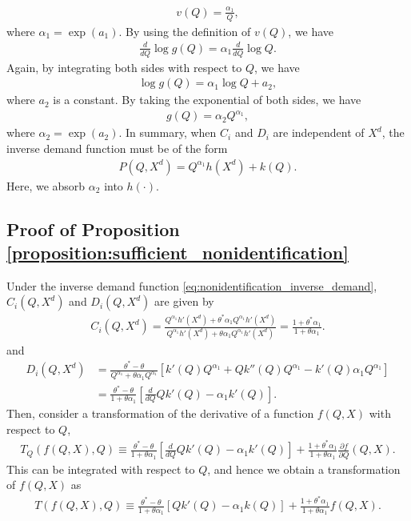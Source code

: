 \documentclass[11pt, a4paper]{article}
\theoremstyle{remark}
\begin{document}
\begin{align}
    v(Q) = \frac{\alpha_1}{Q}, 
\end{align}
where $\alpha_1 = \exp(a_1)$.
By using the definition of $v(Q)$, we have
\begin{align}
    \frac{d }{d Q}\log g(Q) = \alpha_1\frac{d}{dQ}\log Q.
\end{align}
Again, by integrating both sides with respect to $Q$, we have
\begin{align}
    \log g(Q) = \alpha_1\log Q + a_2,
\end{align}
where $a_2$ is a constant.
By taking the exponential of both sides, we have
\begin{align}
    g(Q) = \alpha_2Q^{\alpha_1},
\end{align}
where $\alpha_2 = \exp(a_2)$.
In summary, when $C_i$ and $D_i$ are independent of $X^{d}$, the inverse demand function must be of the form
\begin{align}
    P(Q, X^{d}) = Q^{\alpha_1}h(X^{d}) + k(Q).
\end{align}
Here, we absorb $\alpha_2$ into $h(\cdot)$.






\subsection{Proof of Proposition \ref{proposition:sufficient_nonidentification}}
Under the inverse demand function \eqref{eq:nonidentification_inverse_demand}, $C_i(Q, X^{d})$ and $D_i(Q, X^{d})$ are given by
\begin{align}
    C_i(Q, X^{d}) = \frac{Q^{\alpha_1}h'(X^{d}) + \theta^{*}\alpha_1Q^{\alpha_1}h'(X^{d})}{Q^{\alpha_1}h'(X^{d}) + \theta \alpha_1 Q^{\alpha_1}h'(X^{d})} = \frac{1 + \theta^{*}\alpha_1}{1 + \theta\alpha_1}.
\end{align}
and
\begin{align}
    D_i(Q, X^{d}) & = \frac{\theta^{*} - \theta}{Q^{\alpha_1} + \theta \alpha_1Q^{\alpha_1}} \left[ k'(Q)Q^{\alpha_1} + Qk''(Q) Q^{\alpha_1} - k'(Q)\alpha_1Q^{\alpha_1} \right]\\
    &= \frac{\theta^{*} - \theta}{1 + \theta\alpha_1} \left[\frac{d}{dQ}Qk'(Q)  -\alpha_1k'(Q) \right].
\end{align}
Then, consider a transformation of the derivative of a function $f(Q, X)$ with respect to $Q$,
\begin{align}
    T_Q\left(f(Q,X), Q\right) \equiv \frac{\theta^{*} - \theta}{1 + \theta\alpha_1}\left[\frac{d}{dQ}Qk'(Q)  -\alpha_1k'(Q) \right]+ \frac{1 + \theta^{*}\alpha_1}{1 + \theta\alpha_1} \frac{\partial f}{\partial Q}(Q, X).
\end{align}
This can be integrated with respect to $Q$, and hence we obtain a transformation of $f(Q, X)$ as
\begin{align}
    T\left(f(Q,X), Q\right) \equiv \frac{\theta^{*} - \theta}{1 + \theta\alpha_1} \left[Qk'(Q) - \alpha_1k(Q) \right] + \frac{1 + \theta^{*}\alpha_1}{1 + \theta\alpha_1} f(Q, X).
\end{align}
\end{document}
